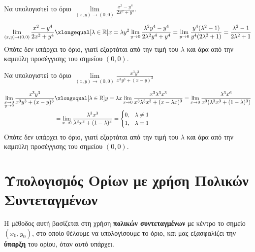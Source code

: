 \begin{example}
  Να υπολογιστεί το όριο $ \lim\limits_{(x,y)\to (0, 0)} \frac{x^{2}-y^{4}}
  {2x^{2}+y^{4}} $. 
  \begin{solution}
    \[
      \lim\limits_{(x,y)\to (0, 0)} \frac{x^{2}-y^{4}}
      {2x^{2}+y^{4}} \xlongequal[\lambda \in \mathbb{R}]
      {x= \lambda y^{2}} \lim_{y \to 0} 
      \frac{\lambda ^{2}y^{4}-y^{4}}{2 \lambda ^{2}y^{4}+y^{4}} = 
      \lim_{y \to 0} \frac{y^{4}(\lambda ^{2}-1)}
      {y^{4}(2 \lambda ^{2}+1)} = 
      \frac{\lambda ^{2}-1}{2 \lambda ^{2}+1} 
    \] 
    Οπότε δεν υπάρχει το όριο, γιατί εξαρτάται από την τιμή του $ \lambda $ 
    και άρα από την καμπύλη προσέγγισης του σημείου $ (0,0) $.
  \end{solution}
\end{example}

\begin{example}
  Να υπολογιστεί το όριο 
  $ \lim\limits_{(x,y)\to (0, 0)} \frac{x^{3}y^{3}}{x^{3}y^{3}+ (x-y)^{3}} $ 
  \begin{solution}
  \item {}
    \begin{align*}
      \lim\limits_{\substack{x \to 0\\ y \to 0}} \frac{x^{3}y^{3}}{x^{3}y^{3} + 
      (x-y)^{3}} 
    &\xlongequal[\lambda \in \mathbb{R}]{y = \lambda x} \lim_{x \to 0} \frac{x^{3} 
    \lambda ^{3} x^{3}}{x^{3} \lambda ^{3} x^{3} + (x - \lambda x)^{3}} 
    = \lim_{x \to 0} \frac{\lambda ^{3}x^{6}}{x^{3} 
    (\lambda ^{3} x^{3} + (1- \lambda)^{3})} \\
    &= \lim_{x \to 0} \frac{\lambda ^{3} x^{3}}{\lambda ^{3}x^{3} + (1- \lambda)^{3}} 
    = 
    \begin{cases} 
      0, & \lambda \neq 1 \\ 
      1, & \lambda = 1 
    \end{cases} 
    \end{align*} 
    Οπότε δεν υπάρχει το όριο, γιατί εξαρτάται από την τιμή του 
    $ \lambda $ και άρα από την καμπύλη προσέγγισης του σημείου 
    $ (0,0) $.
  \end{solution}
\end{example}


\section{Υπολογισμός Ορίων με χρήση Πολικών Συντεταγμένων}

Η μέθοδος αυτή βασίζεται στη χρήση \textbf{πολικών συντεταγμένων} με κέντρο το σημείο 
$ (x_{0}, y_{0}) $, στο οποίο θέλουμε να υπολογίσουμε το όριο, και μας εξασφαλίζει 
την \textbf{ύπαρξη} του ορίου, όταν αυτό υπάρχει.

